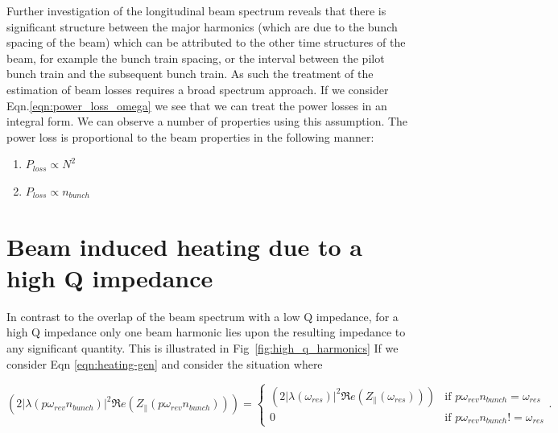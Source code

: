 Further investigation of the longitudinal beam spectrum reveals that there is significant structure between the major harmonics (which are due to the bunch spacing of the beam) which can be attributed to the other time structures of the beam, for example the bunch train spacing, or the interval between the pilot bunch train and the subsequent bunch train. As such the treatment of the estimation of beam losses requires a broad spectrum approach. If we consider Eqn.\ref{eqn:power_loss_omega} we see that we can treat the power losses in an integral form. We can observe a number of properties using this assumption. The power loss is proportional to the beam properties in the following manner:

\begin{enumerate}
\item{$P_{loss} \propto N^{2}$}
\item{$P_{loss} \propto n_{bunch}$}
\end{enumerate}

\section{Beam induced heating due to a high Q impedance}

In contrast to the overlap of the beam spectrum with a low Q impedance, for a high Q impedance only one beam harmonic lies upon the resulting impedance to any significant quantity. This is illustrated in Fig~\ref{fig:high_q_harmonics} If we consider Eqn \ref{eqn:heating-gen} and consider the situation where

\begin{equation}
\left( 2 \left| \lambda \left(p \omega_{rev}n_{bunch} \right)  \right|^{2}  \Re{}e \left( Z_{\parallel} \left(p \omega_{rev}n_{bunch}\right) \right) \right) = 
\begin{cases}
\left( 2 \left| \lambda \left( \omega_{res} \right)  \right|^{2}  \Re{}e \left( Z_{\parallel} \left( \omega_{res} \right) \right) \right) &\textrm{if $p \omega_{rev} n_{bunch} = \omega_{res}$}\\
0								&\textrm{if $p \omega_{rev} n_{bunch} != \omega_{res}$}
\end{cases}
\label{eqn:single_harmonic_profile}.
\end{equation}

